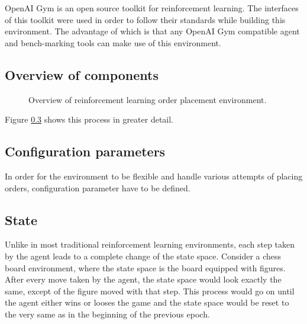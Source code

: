 OpenAI Gym \cite{brockman2016openai} is an open source toolkit for reinforcement learning.
The interfaces of this toolkit were used in order to follow their standards while building this environment.
The advantage of which is that any OpenAI Gym compatible agent and bench-marking tools can make use of this environment.

\subsection{Overview of components}

\begin{figure}[H]
    \centering
    \caption{Overview of reinforcement learning order placement environment.}
    \label{fig:rl-env-overview}
\end{figure}

Figure \ref{} shows this process in greater detail.

\subsection{Configuration parameters}

In order for the environment to be flexible and handle various attempts of placing orders, configuration parameter have to be defined.


\subsection{State}
Unlike in most traditional reinforcement learning environments, each step taken by the agent leads to a complete change of the state space.
Consider a chess board environment, where the state space is the board equipped with figures. 
After every move taken by the agent, the state space would look exactly the same, except of the figure moved with that step. 
This process would go on until the agent either wins or looses the game and the state space would be reset to the very same as in the beginning of the previous epoch.

